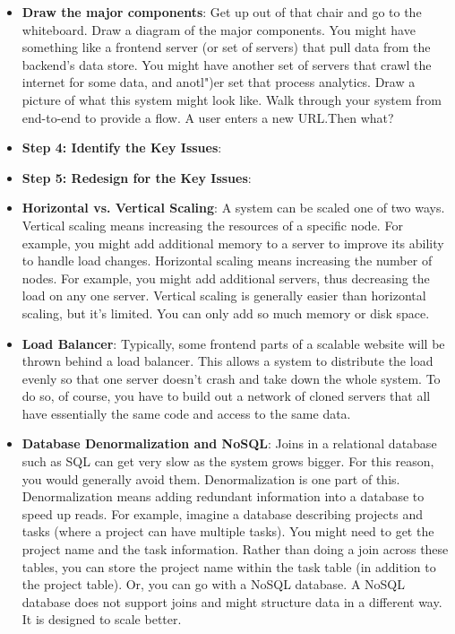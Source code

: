 \documentclass{report}
\begin{document}
\begin{itemize}
        \item \textbf{Draw the major components}: Get up out of that chair and go to the whiteboard. Draw a diagram of the major components. You might have something like a frontend server (or set of servers) that pull data from the backend's data store. You might have another set of servers that crawl the internet for some data, and anotl")er set that process analytics. Draw a picture of what this system might look like.
            \bigbreak \noindent 
            Walk through your system from end-to-end to provide a flow. A user enters a new URL.Then what?
        \item \textbf{Step 4: Identify the Key Issues}:
        \item \textbf{Step 5: Redesign for the Key Issues}:
        \item \textbf{Horizontal vs. Vertical Scaling}: A system can be scaled one of two ways. Vertical scaling means increasing the resources of a specific node. For example, you might add additional memory to a server to improve its ability to handle load changes. Horizontal scaling means increasing the number of nodes. For example, you might add additional servers, thus decreasing the load on any one server.
            \bigbreak \noindent 
            Vertical scaling is generally easier than horizontal scaling, but it's limited. You can only add so much memory or disk space.
        \item \textbf{Load Balancer}: Typically, some frontend parts of a scalable website will be thrown behind a load balancer. This allows a system to distribute the load evenly so that one server doesn't crash and take down the whole system. To do so, of course, you have to build out a network of cloned servers that all have essentially the same code and access to the same data.
        \item \textbf{Database Denormalization and NoSQL}: Joins in a relational database such as SQL can get very slow as the system grows bigger. For this reason, you would generally avoid them.
            \bigbreak \noindent 
            Denormalization is one part of this. Denormalization means adding redundant information into a database to speed up reads. For example, imagine a database describing projects and tasks (where a project can have multiple tasks). You might need to get the project name and the task information. Rather than doing a join across these tables, you can store the project name within the task table (in addition to the project table).
            \bigbreak \noindent 
            Or, you can go with a NoSQL database. A NoSQL database does not support joins and might structure data in a different way. It is designed to scale better.

\end{itemize}
\end{document}
